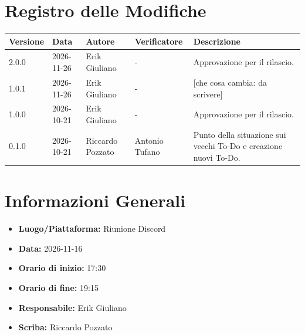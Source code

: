\documentclass[a4paper, 11pt]{article}
\begin{document}
\section*{Registro delle Modifiche}
\vspace{0.5cm}
\begin{center}
\renewcommand{\arraystretch}{1.5}
\begin{tabularx}{\textwidth}{|l|l|l|l|X|}
\hline
\textbf{Versione} & \textbf{Data} & \textbf{Autore} & \textbf{Verificatore} & \textbf{Descrizione} \\ \hline
2.0.0 & 2026-11-26 & Erik Giuliano & - & Approvazione per il rilascio. \\ \hline
1.0.1 & 2026-11-26 & Erik Giuliano & - & [che cosa cambia: da scrivere] \\ \hline
1.0.0 & 2026-10-21 & Erik Giuliano & - & Approvazione per il
rilascio. \\ \hline
0.1.0 & 2026-10-21 & Riccardo Pozzato & Antonio Tufano & Punto della situazione sui vecchi To-Do e creazione nuovi To-Do. \\ \hline

\end{tabularx}
\end{center}

\newpage

\tableofcontents
\newpage
\section{Informazioni Generali}
\begin{itemize}
    \item \textbf{Luogo/Piattaforma:} Riunione Discord
    \item \textbf{Data:} 2026-11-16
    \item \textbf{Orario di inizio:} 17:30
    \item \textbf{Orario di fine:} 19:15
    \item \textbf{Responsabile:} Erik Giuliano
    \item \textbf{Scriba:} Riccardo Pozzato
\end{itemize}
\end{document}
